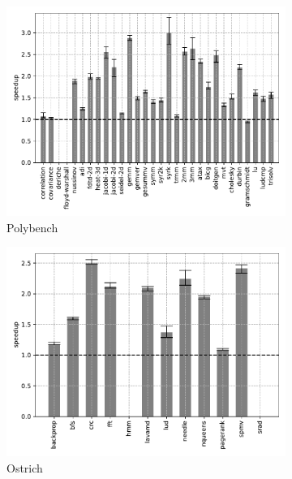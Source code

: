 \begin{figure}
    \centering
    \begin{subfigure}[t]{\textwidth}
        \includegraphics[width=\textwidth]
        {Images/6.1.RQ1/polybench-wasmer-cranelift-simd.pdf}
        \caption{Polybench}
    \end{subfigure}
    \begin{subfigure}[t]{.45\textwidth}
        \includegraphics[width=\textwidth]
        {Images/6.1.RQ1/ostrich-wasmer-cranelift-simd.pdf}
        \caption{Ostrich}
    \end{subfigure}
    \begin{subfigure}[t]{.45\textwidth}

\end{subfigure}
\end{figure}
